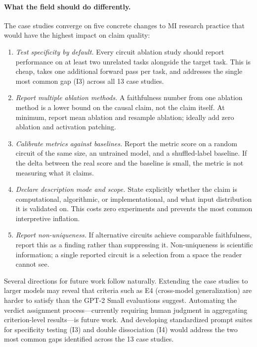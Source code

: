 \documentclass{article}
\begin{document}
\paragraph{What the field should do differently.}
The case studies converge on five concrete changes to MI research practice that would have the highest impact on claim quality:
\begin{enumerate}[nosep]
\item \emph{Test specificity by default.} Every circuit ablation study should report performance on at least two unrelated tasks alongside the target task. This is cheap, takes one additional forward pass per task, and addresses the single most common gap (I3) across all 13 case studies.
\item \emph{Report multiple ablation methods.} A faithfulness number from one ablation method is a lower bound on the causal claim, not the claim itself. At minimum, report mean ablation and resample ablation; ideally add zero ablation and activation patching.
\item \emph{Calibrate metrics against baselines.} Report the metric score on a random circuit of the same size, an untrained model, and a shuffled-label baseline. If the delta between the real score and the baseline is small, the metric is not measuring what it claims.
\item \emph{Declare description mode and scope.} State explicitly whether the claim is computational, algorithmic, or implementational, and what input distribution it is validated on. This costs zero experiments and prevents the most common interpretive inflation.
\item \emph{Report non-uniqueness.} If alternative circuits achieve comparable faithfulness, report this as a finding rather than suppressing it. Non-uniqueness is scientific information; a single reported circuit is a selection from a space the reader cannot see.
\end{enumerate}

Several directions for future work follow naturally. Extending the case studies to larger models may reveal that criteria such as E4 (cross-model generalization) are harder to satisfy than the GPT-2 Small evaluations suggest. Automating the verdict assignment process---currently requiring human judgment in aggregating criterion-level results---is future work. And developing standardized prompt suites for specificity testing (I3) and double dissociation (I4) would address the two most common gaps identified across the 13 case studies.
\end{document}
